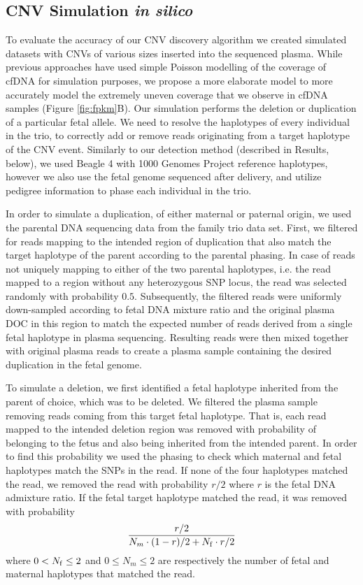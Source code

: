 \subsection{CNV Simulation \emph{in silico}}\label{ss:simulation}
To evaluate the accuracy of our CNV discovery algorithm we created simulated datasets with CNVs of various sizes inserted into the sequenced plasma. While previous approaches have used simple Poisson modelling of the coverage of cfDNA \cite{chen2013} for simulation purposes, we propose a more elaborate model to more accurately model the extremely uneven coverage that we observe in cfDNA samples (Figure \ref{fig:fpkm}B). Our simulation performs the deletion or duplication of a particular fetal allele.  We need to resolve the haplotypes of every individual in the trio, to correctly add or remove reads originating from a target haplotype of the CNV event. Similarly to our detection method (described in Results, below), we used Beagle 4 \cite{browning2013} with 1000 Genomes Project reference haplotypes, however we also use the fetal genome sequenced after delivery, and utilize pedigree information to phase each individual in the trio.

	In order to simulate a duplication, of either maternal or paternal origin, we used the parental DNA sequencing data from the family trio data set. First, we filtered for reads mapping to the intended region of duplication that also match the target haplotype of the parent according to the parental phasing. In case of reads not uniquely mapping to either of the two parental haplotypes, i.e. the read mapped to a region without any heterozygous SNP locus, the read was selected randomly with probability $0.5$. Subsequently, the filtered reads were uniformly down-sampled according to fetal DNA mixture ratio and the original plasma DOC in this region to match the expected number of reads derived from a single fetal haplotype in plasma sequencing. Resulting reads were then mixed together with original plasma reads to create a plasma sample containing the desired duplication in the fetal genome.
	
	To simulate a deletion, we first identified a fetal haplotype inherited from the parent of choice, which was to be deleted. We filtered the plasma sample removing reads coming from this target fetal haplotype. That is, each read mapped to the intended deletion region was removed with probability of belonging to the fetus and also being inherited from the intended parent. In order to find this probability we used the phasing to check which maternal and fetal haplotypes match the SNPs in the read. If none of the four haplotypes matched the read, we removed the read with probability $r/2$ where $r$ is the fetal DNA admixture ratio. If the fetal target haplotype matched the read, it was removed with probability
\begin{align}
\frac{ r/2 } { N_m \cdot (1-r)/2 + N_{\mathrm{f}} \cdot r/2}
\end{align}
where $0 < N_{\mathrm{f}} \leq 2$ and $0 \leq N_m \leq 2$ are respectively the number of fetal and maternal haplotypes that matched the read.
	

